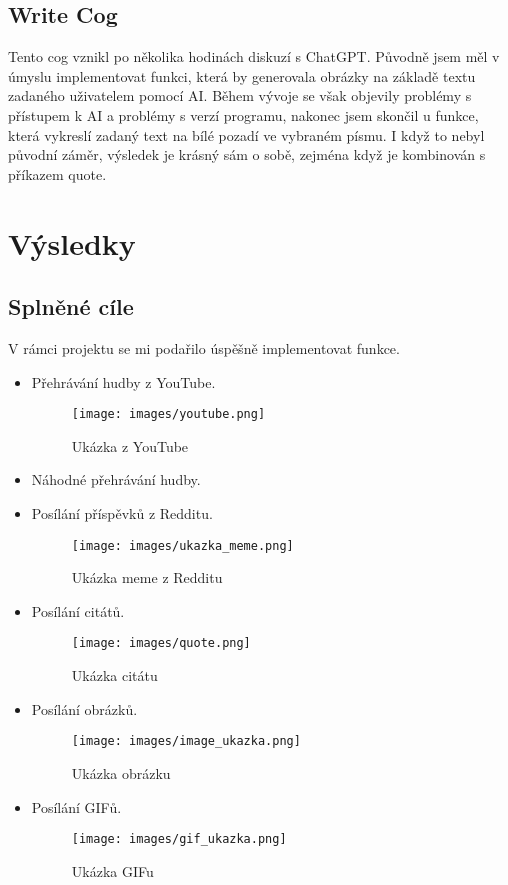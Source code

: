 \documentclass[12pt, a4paper]{report}
\begin{document}
\section{Write Cog}
Tento cog vznikl po několika hodinách diskuzí s ChatGPT. Původně jsem měl v úmyslu implementovat funkci, která by generovala obrázky na základě textu zadaného uživatelem pomocí AI. Během vývoje se však objevily problémy s přístupem k AI a problémy s verzí programu, nakonec jsem  skončil u funkce, která vykreslí zadaný text na bílé pozadí ve vybraném písmu. I když to nebyl původní záměr, výsledek je krásný sám o sobě, zejména když je kombinován s příkazem quote.
\chapter{Výsledky}
\section{Splněné cíle}
V rámci projektu se mi podařilo úspěšně implementovat funkce.
\begin{itemize}
    \item Přehrávání hudby z YouTube.
    \begin{figure}[H]
        \texttt{[image: images/youtube.png]}
        \caption{Ukázka z YouTube}
        \label{fig:youtube}
    \end{figure}
    \item Náhodné přehrávání hudby.
    \item Posílání příspěvků z Redditu.
    \begin{figure}[H]
        \texttt{[image: images/ukazka\_meme.png]}
        \caption{Ukázka meme z Redditu}
        \label{fig:reddit}
    \end{figure}
    \item Posílání citátů.
    \begin{figure}[H]
        \texttt{[image: images/quote.png]}
        \caption{Ukázka citátu}
        \label{fig:quote}
    \end{figure}
    \item Posílání obrázků.
    \begin{figure}[H]
        \texttt{[image: images/image\_ukazka.png]}
        \caption{Ukázka obrázku}
        \label{fig:image}
    \end{figure}
    \newpage
    \item Posílání GIFů.
    \begin{figure}[H]
        \texttt{[image: images/gif\_ukazka.png]}
        \caption{Ukázka GIFu}
        \label{fig:gif}
    \end{figure}
\end{itemize}
\end{document}
